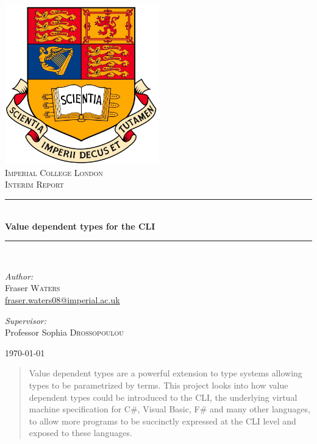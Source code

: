 \documentclass[english]{report}
\newcommand{\HRule}{\rule{\linewidth}{0.5mm}}
\begin{document}
\begin{titlepage}
\begin{center}
\includegraphics[width=0.50\textwidth]{imperial_crest_colour.jpg}\\[1cm]
\textsc{\LARGE Imperial College London}\\[1.5cm]
\textsc{\Large Interim Report}\\[0.5cm]
\HRule \\[0.4cm] 
{ \huge \bfseries Value dependent types for the CLI}\\[0.4cm]
\HRule \\[1.5cm]
\begin{minipage}{0.4\textwidth} 
\begin{flushleft} \large 
\emph{Author:}\\ 
Fraser \textsc{Waters}\\
\href{mailto:fraser.waters08@imperial.ac.uk}{fraser.waters08@imperial.ac.uk} 
\end{flushleft} 
\end{minipage} 
\begin{minipage}{0.4\textwidth} 
\begin{flushright} \large 
\emph{Supervisor:} \\ Professor Sophia \textsc{Drossopoulou} 
\end{flushright} 
\end{minipage}

\vfill

{\large \today}

\end{center}
\end{titlepage}

\tableofcontents

\begin{abstract}
Value dependent types are a powerful extension to type systems allowing
types to be parametrized by terms. This project looks into how value
dependent types could be introduced to the CLI, the underlying virtual
machine specification for C\#, Visual Basic, F\# and many other languages,
to allow more programs to be succinctly expressed at the CLI level
and exposed to these languages.
\end{abstract}
\end{document}
